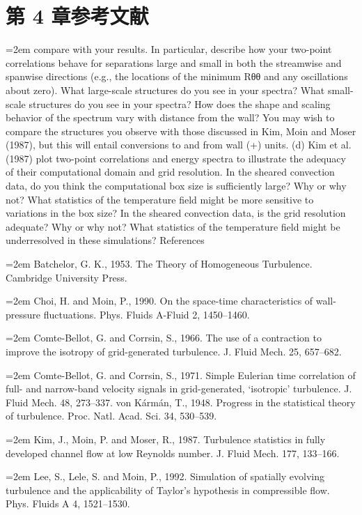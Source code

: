 \documentclass[12pt,a4paper,openany,fontset=none]{ctexbook}
\begin{document}
\section*{第 4 章参考文献}
\par\hangindent=2em compare with your results. In particular, describe how your two-point correlations behave for separations large and small in both the streamwise and spanwise directions (e.g., the locations of the minimum Rθθ and any oscillations about zero). What large-scale structures do you see in your spectra? What small-scale structures do you see in your spectra? How does the shape and scaling behavior of the spectrum vary with distance from the wall? You may wish to compare the structures you observe with those discussed in Kim, Moin and Moser (1987), but this will entail conversions to and from wall (+) units. (d) Kim et al. (1987) plot two-point correlations and energy spectra to illustrate the adequacy of their computational domain and grid resolution. In the sheared convection data, do you think the computational box size is sufficiently large? Why or why not? What statistics of the temperature field might be more sensitive to variations in the box size? In the sheared convection data, is the grid resolution adequate? Why or why not? What statistics of the temperature field might be underresolved in these simulations? References
\par\hangindent=2em Batchelor, G. K., 1953. The Theory of Homogeneous Turbulence. Cambridge University Press.
\par\hangindent=2em Choi, H. and Moin, P., 1990. On the space-time characteristics of wall-pressure fluctuations. Phys. Fluids A-Fluid 2, 1450–1460.
\par\hangindent=2em Comte-Bellot, G. and Corrsin, S., 1966. The use of a contraction to improve the isotropy of grid-generated turbulence. J. Fluid Mech. 25, 657–682.
\par\hangindent=2em Comte-Bellot, G. and Corrsin, S., 1971. Simple Eulerian time correlation of full- and narrow-band velocity signals in grid-generated, ‘isotropic’ turbulence. J. Fluid Mech. 48, 273–337. von Kármán, T., 1948. Progress in the statistical theory of turbulence. Proc. Natl. Acad. Sci. 34, 530–539.
\par\hangindent=2em Kim, J., Moin, P. and Moser, R., 1987. Turbulence statistics in fully developed channel flow at low Reynolds number. J. Fluid Mech. 177, 133–166.
\par\hangindent=2em Lee, S., Lele, S. and Moin, P., 1992. Simulation of spatially evolving turbulence and the applicability of Taylor’s hypothesis in compressible flow. Phys. Fluids A 4, 1521–1530.
\end{document}
